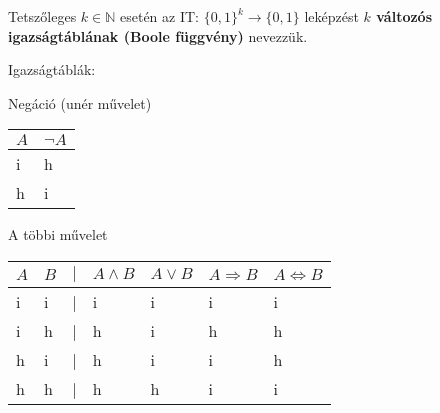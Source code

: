 \documentclass{beamer}
\newcommand{\mbigskip}{\vspace{1em}}
\begin{document}
\begin{frame}
\begin{tcolorbox}[title={K változós igazságtábla}]
Tetszőleges $k \in \mathbb{N}$ esetén az IT: $\{0, 1\}^k \rightarrow \{0, 1\}$ leképzést \textbf{$k$ változós igazságtáblának (Boole függvény)} nevezzük.
\end{tcolorbox}

\begin{block}{Igazságtáblák:}
\begin{table}[h!]
\centering
Negáció (unér művelet)\\
\mbigskip
\begin{tabular}{@{}C{3em}C{3em}@{}}
\toprule
\textbf{$A$} & \textbf{${\neg}A$} \\
\hline
i & h\\
\hdashline
h & i\\
\toprule
\end{tabular}
\end{table}
\mbigskip

\begin{table}[h!]
\centering
A többi művelet\\
\mbigskip
\begin{tabular}{C{1em}C{1em}rC{4.4em}C{4.4em}C{4.4em}C{4.6em}}
\toprule
\textbf{$A$} & \textbf{$B$} & \textbf{$|$} & \textbf{$A \land B$} & \textbf{$A \lor B$} & \textbf{$A \Rightarrow B$} & \textbf{$A \iff B$} \\
\hline
i & i & | & i & i & i & i\\
\hdashline
i & h & | & h & i & h & h\\
\hdashline
h & i & | & h & i & i & h\\
\hdashline
h & h & | & h & h & i & i\\
\toprule
\end{tabular}
\end{table}
\end{block}

\end{frame}

\end{document}
